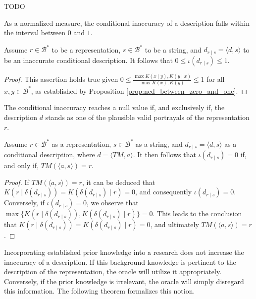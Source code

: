 {\color{red} TODO

As a normalized measure, the conditional inaccuracy of a description falls within the interval between $0$ and $1$.

\begin{proposition}
\label{prop:range_conditional_inaccuracy}
Assume $r \in \mathcal{B}^\ast$ to be a representation, $s \in \mathcal{B}^\ast$ to be a string, and $d_{r \mid s} = \langle d, s \rangle$ to be an inaccurate conditional description. It follows that $0 \leq \iota(d_{r \mid s}) \leq 1$.
\end{proposition}
\begin{proof}
This assertion holds true given $0 \leq \frac{ \max{ K(x \mid y), K(y \mid x) } } { \max{ K(x), K(y) } } \leq 1$ for all $x, y \in \mathcal{B}^\ast$, as established by Proposition \ref{prop:ncd_between_zero_and_one}.
\end{proof}

The conditional inaccuracy reaches a null value if, and exclusively if, the description $d$ stands as one of the plausible valid portrayals of the representation $r$.

\begin{proposition}\label{prop:perfect_description}
Assume $r \in \mathcal{B}^\ast$ as a representation, $s \in \mathcal{B}^\ast$ as a string, and $d_{r \mid s} = \langle d, s \rangle$ as a conditional description, where $ d = \langle TM, a \rangle$. It then follows that $\iota(d_{r \mid s}) = 0$ if, and only if, $TM \left(\langle a, s \rangle \right) = r$.
\end{proposition}
\begin{proof}
If $TM \left(\langle a, s \rangle \right) = r$, it can be deduced that $K \left( r \mid \delta(d_{r \mid s}) \right) = K \left( \delta(d_{r \mid s}) \mid r \right) = 0$, and consequently $\iota(d_{r \mid s}) = 0$. Conversely, if $\iota(d_{r \mid s}) = 0$, we observe that $\max\{ K \left( r \mid \delta(d_{r \mid s}) \right), K \left( \delta(d_{r \mid s}) \mid r \right) \} = 0$. This leads to the conclusion that $K \left( r \mid \delta(d_{r \mid s}) \right) = K \left( \delta(d_{r \mid s}) \mid r \right) = 0$, and ultimately $TM \left(\langle a, s \rangle \right) = r$.
\end{proof}

}

Incorporating established prior knowledge into a research does not increase the inaccuracy of a description. If this background knowledge is pertinent to the description of the representation, the oracle will utilize it appropriately. Conversely, if the prior knowledge is irrelevant, the oracle will simply disregard this information. The following theorem formalizes this notion.


